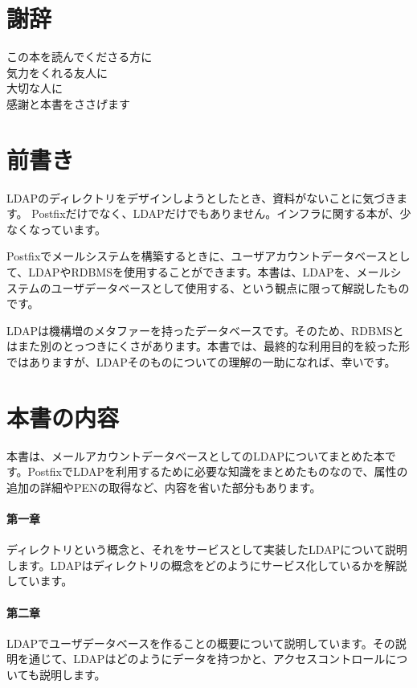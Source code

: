 \section*{謝辞}
\begin{center}
この本を読んでくださる方に \\
気力をくれる友人に \\
大切な人に \\
感謝と本書をささげます
\end{center}

\section*{前書き}
LDAPのディレクトリをデザインしようとしたとき、資料がないことに気づきます。
Postfixだけでなく、LDAPだけでもありません。インフラに関する本が、少なくなっています。

Postfixでメールシステムを構築するときに、ユーザアカウントデータベースとして、LDAPやRDBMSを使用することができます。本書は、LDAPを、メールシステムのユーザデータベースとして使用する、という観点に限って解説したものです。

LDAPは機構増のメタファーを持ったデータベースです。そのため、RDBMSとはまた別のとっつきにくさがあります。本書では、最終的な利用目的を絞った形ではありますが、LDAPそのものについての理解の一助になれば、幸いです。





\section*{本書の内容}
本書は、メールアカウントデータベースとしてのLDAPについてまとめた本です。PostfixでLDAPを利用するために必要な知識をまとめたものなので、属性の追加の詳細やPENの取得など、内容を省いた部分もあります。

\paragraph{第一章}
ディレクトリという概念と、それをサービスとして実装したLDAPについて説明します。LDAPはディレクトリの概念をどのようにサービス化しているかを解説しています。

\paragraph{第二章}
LDAPでユーザデータベースを作ることの概要について説明しています。その説明を通じて、LDAPはどのようにデータを持つかと、アクセスコントロールについても説明します。

